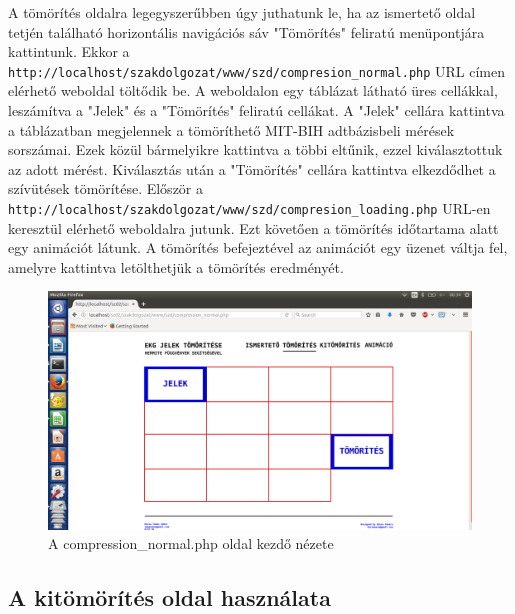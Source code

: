 \documentclass[oneside,titlepage,12pt,a4paper]{report}
\begin{document}
A tömörítés oldalra legegyszerűbben úgy juthatunk le, ha az ismertető oldal tetjén található horizontális navigációs sáv "Tömörítés" feliratú menüpontjára kattintunk. Ekkor a \texttt{http://localhost/szakdolgozat/www/szd/compresion\_normal.php} URL címen elérhető weboldal töltődik be. A weboldalon egy táblázat látható üres cellákkal, leszámítva a "Jelek" és a "Tömörítés" feliratú cellákat. A "Jelek" cellára kattintva a táblázatban megjelennek a tömöríthető MIT-BIH adtbázisbeli mérések sorszámai. Ezek közül bármelyikre kattintva a többi eltűnik, ezzel kiválasztottuk az adott mérést. Kiválasztás után a "Tömörítés" cellára kattintva elkezdődhet a szívütések tömörítése. Először a \texttt{http://localhost/szakdolgozat/www/szd/compresion\_loading.php} \linebreak URL-en keresztül elérhető weboldalra jutunk. Ezt követően a tömörítés időtartama alatt egy animációt látunk. A tömörítés befejeztével az animációt egy üzenet váltja fel, amelyre kattintva letölthetjük a tömörítés eredményét.

\begin{figure}[H]
\begin{center}
  \includegraphics[width=150mm]{./Abrak/WWW/tom_alap.png}
  \caption{A compression\_normal.php oldal kezdő nézete}
\end{center}
\end{figure}

\subsection*{A kitömörítés oldal használata}
\end{document}
